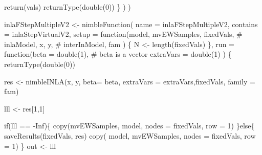\documentclass[
]{article}
\newenvironment{Shaded}{\begin{snugshade}}{\end{snugshade}}
\newcommand{\AttributeTok}[1]{\textcolor[rgb]{0.40,0.45,0.13}{#1}}
\newcommand{\CommentTok}[1]{\textcolor[rgb]{0.37,0.37,0.37}{#1}}
\newcommand{\ConstantTok}[1]{\textcolor[rgb]{0.56,0.35,0.01}{#1}}
\newcommand{\ControlFlowTok}[1]{\textcolor[rgb]{0.00,0.23,0.31}{#1}}
\newcommand{\DecValTok}[1]{\textcolor[rgb]{0.68,0.00,0.00}{#1}}
\newcommand{\FunctionTok}[1]{\textcolor[rgb]{0.28,0.35,0.67}{#1}}
\newcommand{\NormalTok}[1]{\textcolor[rgb]{0.00,0.23,0.31}{#1}}
\newcommand{\OtherTok}[1]{\textcolor[rgb]{0.00,0.23,0.31}{#1}}
\newcommand{\SpecialCharTok}[1]{\textcolor[rgb]{0.37,0.37,0.37}{#1}}
\newcommand{\StringTok}[1]{\textcolor[rgb]{0.13,0.47,0.30}{#1}}
\begin{document}
\begin{Shaded}
\begin{Highlighting}[]
      \FunctionTok{return}\NormalTok{(vals)}
      \FunctionTok{returnType}\NormalTok{(}\FunctionTok{double}\NormalTok{(}\DecValTok{0}\NormalTok{))}
\NormalTok{    \}}
\NormalTok{  )}
\NormalTok{)}



\NormalTok{inlaFStepMultipleV2 }\OtherTok{\textless{}{-}} \FunctionTok{nimbleFunction}\NormalTok{(}
  \AttributeTok{name =} \StringTok{\textquotesingle{}inlaFStepMultipleV2\textquotesingle{}}\NormalTok{,}
  \AttributeTok{contains =}\NormalTok{ inlaStepVirtualV2,}
  \AttributeTok{setup =} \ControlFlowTok{function}\NormalTok{(model,}
\NormalTok{                   mvEWSamples,}
\NormalTok{                   fixedVals,}
                   \CommentTok{\# inlaModel,}
\NormalTok{                   x,}
\NormalTok{                   y,}
                   \CommentTok{\# interInModel,}
\NormalTok{                   fam}
\NormalTok{  ) \{}
\NormalTok{    N }\OtherTok{\textless{}{-}} \FunctionTok{length}\NormalTok{(fixedVals)}
\NormalTok{  \},}
  \AttributeTok{run =} \ControlFlowTok{function}\NormalTok{(}\AttributeTok{beta =} \FunctionTok{double}\NormalTok{(}\DecValTok{1}\NormalTok{), }\CommentTok{\# beta is a vector}
                  \AttributeTok{extraVars =} \FunctionTok{double}\NormalTok{(}\DecValTok{1}\NormalTok{)}
\NormalTok{  ) \{}
    \FunctionTok{returnType}\NormalTok{(}\FunctionTok{double}\NormalTok{(}\DecValTok{0}\NormalTok{))}

\NormalTok{    res }\OtherTok{\textless{}{-}} \FunctionTok{nimbleINLA}\NormalTok{(x, y, }\AttributeTok{beta=}\NormalTok{ beta, }\AttributeTok{extraVars =}\NormalTok{ extraVars,fixedVals,  }\AttributeTok{family =}\NormalTok{ fam)}

\NormalTok{    lll }\OtherTok{\textless{}{-}}\NormalTok{ res[}\DecValTok{1}\NormalTok{,}\DecValTok{1}\NormalTok{]}

    \ControlFlowTok{if}\NormalTok{(lll }\SpecialCharTok{==} \SpecialCharTok{{-}}\ConstantTok{Inf}\NormalTok{)\{}
      \FunctionTok{copy}\NormalTok{(mvEWSamples, model, }\AttributeTok{nodes =}\NormalTok{ fixedVals, }\AttributeTok{row =} \DecValTok{1}\NormalTok{)}
\NormalTok{    \}}\ControlFlowTok{else}\NormalTok{\{}
      \FunctionTok{saveResults}\NormalTok{(fixedVals, res)}
      \FunctionTok{copy}\NormalTok{( model, mvEWSamples, }\AttributeTok{nodes =}\NormalTok{ fixedVals, }\AttributeTok{row =} \DecValTok{1}\NormalTok{)}
\NormalTok{    \}}
\NormalTok{    out }\OtherTok{\textless{}{-}}\NormalTok{ lll}


\end{Highlighting}
\end{Shaded}
\end{document}
